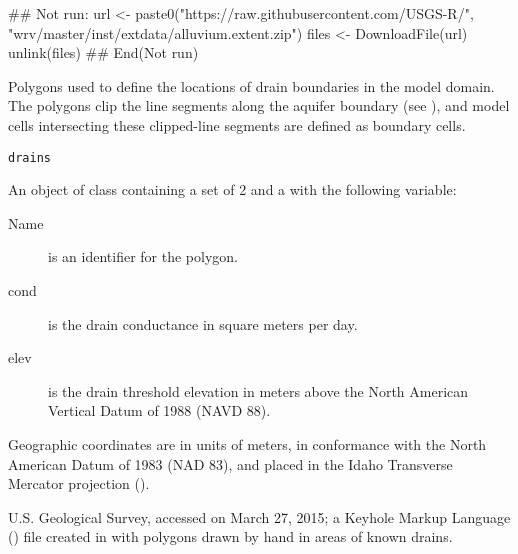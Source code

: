 \documentclass[a4paper]{book}
\begin{document}
%
\begin{Examples}
\begin{ExampleCode}
## Not run: 
url <- paste0("https://raw.githubusercontent.com/USGS-R/",
              "wrv/master/inst/extdata/alluvium.extent.zip")
files <- DownloadFile(url)
unlink(files)
## End(Not run)
\end{ExampleCode}
\end{Examples}
%
\begin{Description}\relax
Polygons used to define the locations of drain boundaries in the model domain.
The polygons clip the line segments along the aquifer boundary (see ), and model cells intersecting these clipped-line segments are defined as boundary cells.
\end{Description}
%
\begin{Usage}
\begin{verbatim}
drains
\end{verbatim}
\end{Usage}
%
\begin{Format}
An object of  class containing a set of 2  and a  with the following variable:
\begin{description}

\item[Name] is an identifier for the polygon.
\item[cond] is the drain conductance in square meters per day.
\item[elev] is the drain threshold elevation in meters above the North American Vertical Datum of 1988 (NAVD 88).

\end{description}

Geographic coordinates are in units of meters, in conformance with the North American Datum of 1983 (NAD 83), and placed in the
Idaho Transverse Mercator projection ().
\end{Format}
%
\begin{Source}\relax
U.S. Geological Survey, accessed on March 27, 2015;
a Keyhole Markup Language () file created in  with polygons drawn by hand in areas of known drains.
\end{Source}
\end{document}

